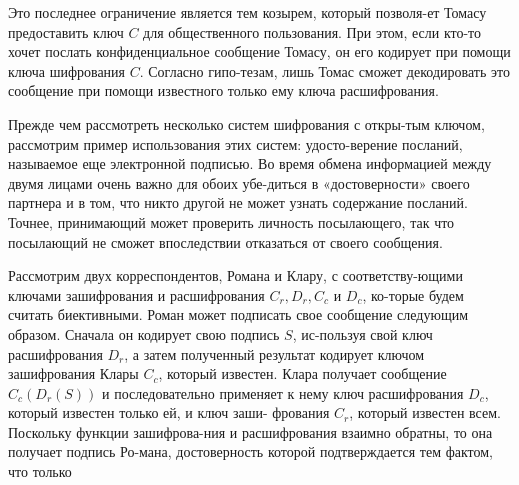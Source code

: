 \rule{0pt}{18pt}
 Это последнее ограничение является тем козырем, который 
позволя-\linebreak ет Томасу предоставить ключ $C$ для общественного пользования. При\linebreak
этом, если кто-то хочет послать конфиденциальное сообщение Томасу,\linebreak
он его кодирует при помощи ключа шифрования $C$. Согласно 
гипо-\linebreak тезам, лишь Томас сможет декодировать это сообщение при помощи\linebreak
известного только ему ключа расшифрования.\par
 Прежде чем рассмотреть несколько систем шифрования с 
откры-\linebreak тым ключом, рассмотрим пример использования этих систем: 
удосто-\linebreak верение посланий, называемое еще электронной подписью. Во время\linebreak
обмена информацией между двумя лицами очень важно для обоих 
убе-\linebreak диться в «достоверности» своего партнера и в том, что никто другой \linebreak
не может узнать содержание посланий. Точнее, принимающий может\linebreak
проверить личность посылающего, так что посылающий не сможет 
впоследствии отказаться от своего сообщения.\par
 Рассмотрим двух корреспондентов, Романа и Клару, с 
соответству-\linebreak ющими ключами зашифрования и расшифрования $C_r , D_r , C_c$ и $D_c$, ко-\linebreak торые будем считать биективными. Роман может подписать свое 
сообщение следующим образом. Сначала он кодирует свою подпись $S$, 
ис-\linebreak пользуя свой ключ расшифрования $D_r$, а затем полученный результат
кодирует ключом зашифрования Клары $C_c$, который известен. Клара \linebreak
получает сообщение $C_c(D_r(S))$ и последовательно применяет к нему \linebreak
ключ расшифрования $D_c$, который известен только ей, и ключ 
заши- \linebreak фрования $C_r$, который известен всем. Поскольку функции 
зашифрова-\linebreak ния и расшифрования взаимно обратны, то она получает подпись 
Ро-\linebreak мана, достоверность которой подтверждается тем фактом, что только\linebreak
